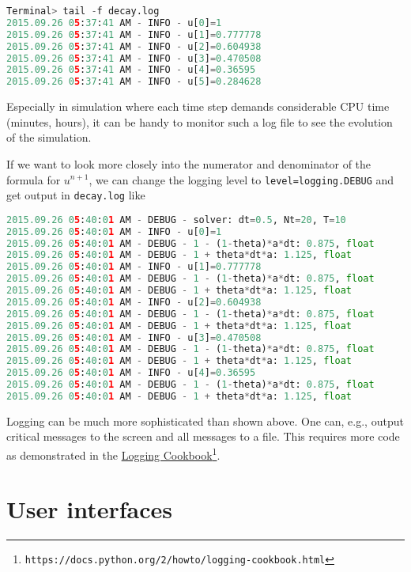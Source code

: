 \documentclass[graybox,sectrefs,envcountresetchap,open=right,final]{svmonodo}
\begin{document}
\begin{lstlisting}[language=Python,style=blue1_bluegreen]
Terminal> tail -f decay.log
2015.09.26 05:37:41 AM - INFO - u[0]=1
2015.09.26 05:37:41 AM - INFO - u[1]=0.777778
2015.09.26 05:37:41 AM - INFO - u[2]=0.604938
2015.09.26 05:37:41 AM - INFO - u[3]=0.470508
2015.09.26 05:37:41 AM - INFO - u[4]=0.36595
2015.09.26 05:37:41 AM - INFO - u[5]=0.284628
\end{lstlisting}
Especially in simulation where each time step demands considerable
CPU time (minutes, hours), it can be handy to monitor such a log file
to see the evolution of the simulation.

If we want to look more closely into the numerator and denominator of
the formula for $u^{n+1}$, we can change the logging level to
\texttt{level=logging.DEBUG} and get output in \texttt{decay.log} like

\begin{lstlisting}[language=Python,style=gray]
2015.09.26 05:40:01 AM - DEBUG - solver: dt=0.5, Nt=20, T=10
2015.09.26 05:40:01 AM - INFO - u[0]=1
2015.09.26 05:40:01 AM - DEBUG - 1 - (1-theta)*a*dt: 0.875, float
2015.09.26 05:40:01 AM - DEBUG - 1 + theta*dt*a: 1.125, float
2015.09.26 05:40:01 AM - INFO - u[1]=0.777778
2015.09.26 05:40:01 AM - DEBUG - 1 - (1-theta)*a*dt: 0.875, float
2015.09.26 05:40:01 AM - DEBUG - 1 + theta*dt*a: 1.125, float
2015.09.26 05:40:01 AM - INFO - u[2]=0.604938
2015.09.26 05:40:01 AM - DEBUG - 1 - (1-theta)*a*dt: 0.875, float
2015.09.26 05:40:01 AM - DEBUG - 1 + theta*dt*a: 1.125, float
2015.09.26 05:40:01 AM - INFO - u[3]=0.470508
2015.09.26 05:40:01 AM - DEBUG - 1 - (1-theta)*a*dt: 0.875, float
2015.09.26 05:40:01 AM - DEBUG - 1 + theta*dt*a: 1.125, float
2015.09.26 05:40:01 AM - INFO - u[4]=0.36595
2015.09.26 05:40:01 AM - DEBUG - 1 - (1-theta)*a*dt: 0.875, float
2015.09.26 05:40:01 AM - DEBUG - 1 + theta*dt*a: 1.125, float
\end{lstlisting}

Logging can be much more sophisticated than shown above. One can, e.g.,
output critical messages to the screen and all messages to a file.
This requires more code as demonstrated in the \href{{https://docs.python.org/2/howto/logging-cookbook.html}}{Logging Cookbook}\footnote{\texttt{https://docs.python.org/2/howto/logging-cookbook.html}}.

\section{User interfaces}
\label{softeng1:basic:UI}
\end{document}

